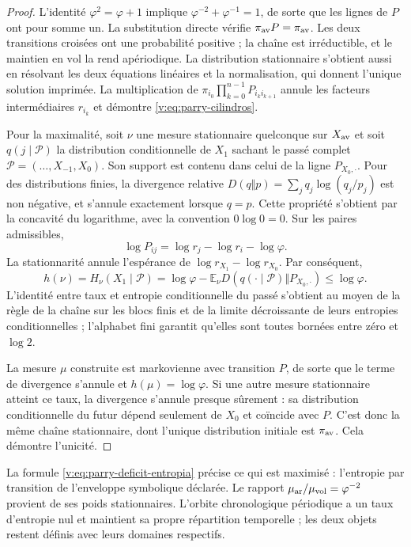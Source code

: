 \begin{proof}
L’identité \(\varphi^2=\varphi+1\) implique
\(\varphi^{-2}+\varphi^{-1}=1\), de sorte que les lignes de \(P\)
ont pour somme un. La substitution directe vérifie
\(\pi_{\rm av}P=\pi_{\rm av}\). Les deux transitions croisées
ont une probabilité positive ; la chaîne est irréductible, et le maintien
en \(\mathrm{vol}\) la rend apériodique. La distribution stationnaire
s’obtient aussi en résolvant les deux équations linéaires et la
normalisation, qui donnent l’unique solution imprimée. La multiplication de
\(\pi_{i_0}\prod_{k=0}^{n-1}P_{i_k i_{k+1}}\) annule les facteurs
intermédiaires \(r_{i_k}\) et démontre \eqref{v:eq:parry-cilindros}.

Pour la maximalité, soit \(\nu\) une mesure stationnaire quelconque
sur \(X_{\rm av}\) et soit
\(q(j\mid\mathcal P)\) la distribution conditionnelle de \(X_1\)
sachant le passé complet \(\mathcal P=(\ldots,X_{-1},X_0)\).
Son support est contenu dans celui de la ligne \(P_{X_0,\cdot}\).
Pour des distributions finies, la divergence relative
\(D(q\Vert p)=\sum_jq_j\log(q_j/p_j)\) est non négative, et
s’annule exactement lorsque \(q=p\). Cette propriété s’obtient par
la concavité du logarithme, avec la convention \(0\log0=0\).
Sur les paires admissibles,
\[
 \log P_{ij}=\log r_j-\log r_i-\log\varphi.
\]
La stationnarité annule l’espérance de
\(\log r_{X_1}-\log r_{X_0}\). Par conséquent,
\begin{equation}
 h(\nu)=H_\nu(X_1\mid\mathcal P)
 =\log\varphi-
 \mathbb E_\nu D\!\left(q(\cdot\mid\mathcal P)
                  \Vert P_{X_0,\cdot}\right)
 \leq\log\varphi.
 \label{v:eq:parry-deficit-entropia}
\end{equation}
L’identité entre taux et entropie conditionnelle du passé s’obtient
au moyen de la règle de la chaîne sur les blocs finis et de la limite
décroissante de leurs entropies conditionnelles ; l’alphabet fini garantit
qu’elles sont toutes bornées entre zéro et \(\log2\).

La mesure \(\mu\) construite est markovienne avec transition \(P\),
de sorte que le terme de divergence s’annule et
\(h(\mu)=\log\varphi\). Si une autre mesure stationnaire atteint
ce taux, la divergence s’annule presque sûrement : sa distribution
conditionnelle du futur dépend seulement de \(X_0\) et coïncide avec \(P\).
C’est donc la même chaîne stationnaire, dont l’unique distribution initiale
est \(\pi_{\rm av}\). Cela démontre l’unicité.
\end{proof}

La formule \eqref{v:eq:parry-deficit-entropia} précise ce qui est maximisé :
l’entropie par transition de l’enveloppe symbolique déclarée. Le rapport
\(\mu_{\rm ar}/\mu_{\rm vol}=\varphi^{-2}\) provient de ses poids
stationnaires. L’orbite chronologique périodique a un taux d’entropie
nul et maintient sa propre répartition temporelle ; les deux objets restent
définis avec leurs domaines respectifs.
